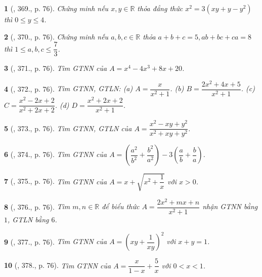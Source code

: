 \documentclass{article}
\newtheorem{baitoan}{}
\begin{document}
\begin{baitoan}[\cite{Binh_Toan_9_tap_2}, 369., p. 76]
	Chứng minh nếu $x,y\in\mathbb{R}$ thỏa đẳng thức $x^2 = 3(xy + y - y^2)$ thì $0\le y\le4$.
\end{baitoan}

\begin{baitoan}[\cite{Binh_Toan_9_tap_2}, 370., p. 76]
	Chứng minh nếu $a,b,c\in\mathbb{R}$ thỏa $a + b + c = 5,ab + bc + ca = 8$ thì $1\le a,b,c\le\dfrac{7}{3}$.
\end{baitoan}

\begin{baitoan}[\cite{Binh_Toan_9_tap_2}, 371., p. 76]
	Tìm {\rm GTNN} của $A = x^4 - 4x^3 + 8x + 20$.
\end{baitoan}

\begin{baitoan}[\cite{Binh_Toan_9_tap_2}, 372., p. 76]
	Tìm {\rm GTNN, GTLN}: (a) $A = \dfrac{x}{x^2 + 1}$. (b) $B = \dfrac{2x^2 + 4x + 5}{x^2 + 1}$. (c) $C = \dfrac{x^2 - 2x + 2}{x^2 + 2x + 2}$. (d) $D = \dfrac{x^2 + 2x + 2}{x^2 + 1}$.
\end{baitoan}

\begin{baitoan}[\cite{Binh_Toan_9_tap_2}, 373., p. 76]
	Tìm {\rm GTNN, GTLN} của $A = \dfrac{x^2 - xy + y^2}{x^2 + xy + y^2}$.
\end{baitoan}

\begin{baitoan}[\cite{Binh_Toan_9_tap_2}, 374., p. 76]
	Tìm {\rm GTNN} của $A = \left(\dfrac{a^2}{b^2} + \dfrac{b^2}{a^2}\right) - 3\left(\dfrac{a}{b} + \dfrac{b}{a}\right)$.
\end{baitoan}

\begin{baitoan}[\cite{Binh_Toan_9_tap_2}, 375., p. 76]
	Tìm {\rm GTNN} của $A = x + \sqrt{x^2 + \dfrac{1}{x}}$ với $x > 0$.
\end{baitoan}

\begin{baitoan}[\cite{Binh_Toan_9_tap_2}, 376., p. 76]
	Tìm $m,n\in\mathbb{R}$ để biểu thức $A = \dfrac{2x^2 + mx + n}{x^2 + 1}$ nhận {\rm GTNN} bằng $1$, {\rm GTLN} bằng $6$.
\end{baitoan}

\begin{baitoan}[\cite{Binh_Toan_9_tap_2}, 377., p. 76]
	Tìm {\rm GTNN} của $A = \left(xy + \dfrac{1}{xy}\right)^2$ với $x + y = 1$.
\end{baitoan}

\begin{baitoan}[\cite{Binh_Toan_9_tap_2}, 378., p. 76]
	Tìm {\rm GTNN} của $A = \dfrac{x}{1 - x} + \dfrac{5}{x}$ với $0 < x < 1$.
\end{baitoan}
\end{document}

